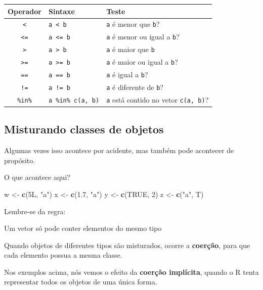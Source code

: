 \documentclass[10pt,a4paper]{book}
\newenvironment{Shaded}{\begin{snugshade}}{\end{snugshade}}
\newcommand{\KeywordTok}[1]{\textcolor[rgb]{0.13,0.29,0.53}{\textbf{#1}}}
\newcommand{\DecValTok}[1]{\textcolor[rgb]{0.00,0.00,0.81}{#1}}
\newcommand{\FloatTok}[1]{\textcolor[rgb]{0.00,0.00,0.81}{#1}}
\newcommand{\StringTok}[1]{\textcolor[rgb]{0.31,0.60,0.02}{#1}}
\newcommand{\OtherTok}[1]{\textcolor[rgb]{0.56,0.35,0.01}{#1}}
\newcommand{\NormalTok}[1]{#1}
\begin{document}
\begin{longtable}[]{@{}cll@{}}
\toprule
Operador & Sintaxe & Teste\tabularnewline
\midrule
\endhead
\texttt{\textless{}} & \texttt{a\ \textless{}\ b} & \texttt{a} é menor
que \texttt{b}?\tabularnewline
\texttt{\textless{}=} & \texttt{a\ \textless{}=\ b} & \texttt{a} é menor
ou igual a \texttt{b}?\tabularnewline
\texttt{\textgreater{}} & \texttt{a\ \textgreater{}\ b} & \texttt{a} é
maior que \texttt{b}\tabularnewline
\texttt{\textgreater{}=} & \texttt{a\ \textgreater{}=\ b} & \texttt{a} é
maior ou igual a \texttt{b}?\tabularnewline
\texttt{==} & \texttt{a\ ==\ b} & \texttt{a} é igual a
\texttt{b}?\tabularnewline
\texttt{!=} & \texttt{a\ !=\ b} & \texttt{a} é diferente de
\texttt{b}?\tabularnewline
\texttt{\%in\%} & \texttt{a\ \%in\%\ c(a,\ b)} & \texttt{a} está contido
no vetor \texttt{c(a,\ b)}?\tabularnewline
\bottomrule
\end{longtable}

\subsection{Misturando classes de
objetos}\label{misturando-classes-de-objetos}

Algumas vezes isso acontece por acidente, mas também pode acontecer de
propósito.

O que acontece aqui?

\begin{Shaded}
\begin{Highlighting}[]
\NormalTok{w <-}\StringTok{ }\KeywordTok{c}\NormalTok{(5L, }\StringTok{"a"}\NormalTok{)}
\NormalTok{x <-}\StringTok{ }\KeywordTok{c}\NormalTok{(}\FloatTok{1.7}\NormalTok{, }\StringTok{"a"}\NormalTok{)}
\NormalTok{y <-}\StringTok{ }\KeywordTok{c}\NormalTok{(}\OtherTok{TRUE}\NormalTok{, }\DecValTok{2}\NormalTok{)}
\NormalTok{z <-}\StringTok{ }\KeywordTok{c}\NormalTok{(}\StringTok{"a"}\NormalTok{, T)}
\end{Highlighting}
\end{Shaded}

Lembre-se da regra:

Um vetor só pode conter elementos do mesmo tipo

Quando objetos de diferentes tipos são misturados, ocorre a
\textbf{coerção}, para que cada elemento possua a mesma classe.

Nos exemplos acima, nós vemos o efeito da \textbf{coerção implícita},
quando o R tenta representar todos os objetos de uma única forma.
\end{document}
